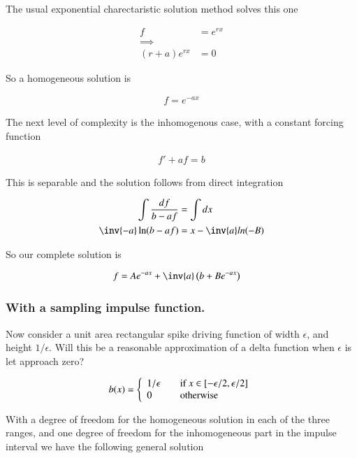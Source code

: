 \documentclass{article}
\begin{document}
The usual exponential charectaristic solution method solves this one

\begin{align*}
f &= e^{rx} \\
\implies \\
(r + a) e^{rx} &= 0
\end{align*}

So a homogeneous solution is

\begin{align*}
f = e^{-ax}
\end{align*}

The next level of complexity is the inhomogenous case, with a constant forcing function

\begin{align*}
f' + a f = b
\end{align*}

This is separable and the solution follows from direct integration

\begin{align*}
\int \frac{df}{b - a f} &= \int dx \\
\inv{-a}\ln(b - af) &= x - \inv{a} ln(-B) \\
\end{align*}

So our complete solution is

\begin{align*}
f &= A e^{-ax} + \inv{a}\left(b + B e^{-a x}\right)
\end{align*}

\subsubsection{ With a sampling impulse function. }

Now consider a unit area rectangular spike driving function of width $\epsilon$, and height $1/\epsilon$.  Will this be a reasonable approximation of a delta function
when $\epsilon$ is let approach zero?

\begin{align*}
b(x) = 
\left\{
\begin{array}{l l}
1/{\epsilon} & \quad \mbox{if $x \in \left[-\epsilon/2, \epsilon/2 \right]$} \\
0              & \quad \mbox{otherwise}
\end{array} \right.
\end{align*}

With a degree of freedom for the homogeneous solution in each of the three ranges, and one degree of freedom for the inhomogeneous part in the impulse interval we have the following general solution
\end{document}
